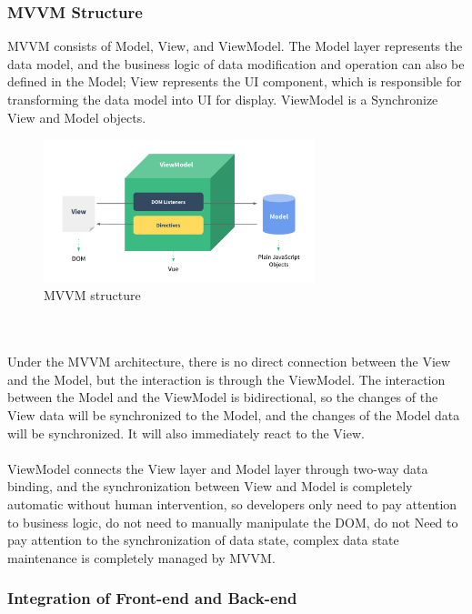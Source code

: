 \documentclass{article}
\begin{document}
\subsubsection{MVVM Structure}

MVVM consists of Model, View, and ViewModel. The Model layer represents the data model, and the business logic of data modification and operation can also be defined in the Model; View represents the UI component, which is responsible for transforming the data model into UI for display. ViewModel is a Synchronize View and Model objects.
\begin{figure}[!htp]
    \centering
    \includegraphics[width=0.7\textwidth]{mvvm.png}
    \caption{\label{fig:mvvm}MVVM structure}
\end{figure}
\\\\
Under the MVVM architecture, there is no direct connection between the View and the Model, but the interaction is through the ViewModel. The interaction between the Model and the ViewModel is bidirectional, so the changes of the View data will be synchronized to the Model, and the changes of the Model data will be synchronized. It will also immediately react to the View.
\\\\
ViewModel connects the View layer and Model layer through two-way data binding, and the synchronization between View and Model is completely automatic without human intervention, so developers only need to pay attention to business logic, do not need to manually manipulate the DOM, do not Need to pay attention to the synchronization of data state, complex data state maintenance is completely managed by MVVM.

\subsubsection{Integration of Front-end and Back-end}
\end{document}

